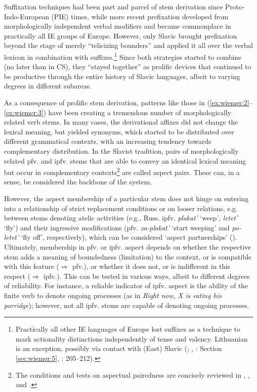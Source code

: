 \documentclass[output=paper,colorlinks,citecolor=brown]{langscibook}
\begin{document}
Suffixation techniques had been part and parcel of stem derivation since Proto-Indo-European (PIE) times, while more recent prefixation developed from morphologically independent verbal modifiers and became commonplace in practically all IE groups of Europe. However, only Slavic brought prefixation beyond the stage of merely “telicizing bounders” and applied it all over the verbal lexicon in combination with suffixes.\footnote{\label{fn:9}Practically all other IE languages of Europe lost suffixes as a technique to mark actionality distinctions independently of tense and valency. Lithuanian is an exception, possibly via contact with (East) Slavic (\cite{Arkadiev2014}; \citeyear{Arkadiev2015}, \cite{wiemer_serzant_2017}: Section \ref{sec:wiemer:5}, \cite{wiemer_2023}: 205--212).} Since both strategies started to combine (no later than in CS), they “stayed together” as prolific devices that continued to be productive through the entire history of Slavic languages, albeit to varying degrees in different subareas.

As a consequence of prolific stem derivation, patterns like those in (\ref{ex:wiemer:2}--\ref{ex:wiemer:3}) have been creating a tremendous number of morphologically related verb stems. In many cases, the derivational affixes did not change the lexical meaning, but yielded synonyms, which started to be distributed over different grammatical contexts, with an increasing tendency towards complementary distribution. In the Slavist tradition, pairs of morphologically related pfv. and ipfv. stems that are able to convey an identical lexical meaning but occur in complementary contexts\footnote{The conditions and tests on aspectual pairedness are concisely reviewed in \citet[227--228]{wiemer_2017}, \citet[236--240]{WiemerWyroślak2020}, and \citet[27--29]{Łaziński2020}.} are called aspect pairs. These can, in a sense, be considered the backbone of the system. 

However, the aspect membership of a particular stem does not hinge on entering into a relationship of strict replacement conditions or on looser relations, e.g. between stems denoting atelic activities (e.g., Russ. ipfv. \textit{plakat’} ‘weep’, \textit{letet’} ‘fly’) and their ingressive modifications (pfv. \textit{za-plakat’} ‘start weeping’ and \textit{po-letet’} ‘fly off’, respectively), which can be considered ‘aspect partnerships’ (\cite{Lehmann1988}). Ultimately, membership in pfv. or ipfv. aspect depends on whether the respective stem adds a meaning of boundedness (limitation) to the context, or is compatible with this feature ($\Rightarrow$ pfv.), or whether it does not, or is indifferent in this respect ($\Rightarrow$ ipfv.). This can be tested in various ways, albeit to different degrees of reliability. For instance, a reliable indicator of ipfv. aspect is the ability of the finite verb to denote ongoing processes (as in \textit{Right now, X is eating his porridge}); however, not all ipfv. stems are capable of denoting ongoing processes.
\end{document}
